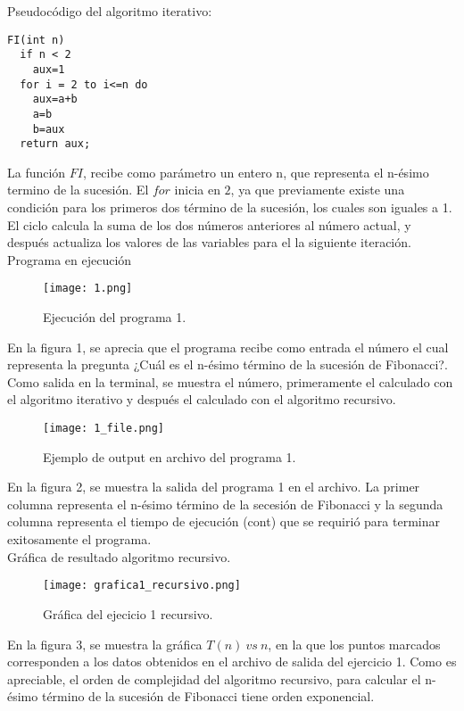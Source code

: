 \documentclass[12pt]{report}
\begin{document}
	Pseudocódigo del algoritmo iterativo:
	\lstset{language=C, breaklines=true, basicstyle=\footnotesize}
	\lstset{numbers=left, numberstyle=\tiny, stepnumber=1, numbersep=10pt}
	\begin{lstlisting}
FI(int n)
  if n < 2 
    aux=1
  for i = 2 to i<=n do
    aux=a+b	
    a=b		
    b=aux
  return aux;
	\end{lstlisting}
	
	La función $FI$, recibe como parámetro un entero n, que representa el n-ésimo termino de la sucesión. El $for$ inicia en $2$, ya que previamente existe una condición para los primeros dos término de la sucesión, los cuales son iguales a 1. El ciclo calcula la suma de los dos números anteriores al número actual, y después actualiza los valores de las variables para el la siguiente iteración.\\
	
	Programa en ejecución\\
	\begin{figure}[H]
		\texttt{[image: 1.png]}
		\centering
		\caption{Ejecución del programa 1.}
		\centering
	\end{figure}
	En la figura 1, se aprecia que el programa recibe como entrada el número el cual representa la pregunta ¿Cuál es el n-ésimo término de la sucesión de Fibonacci?. Como salida en la terminal, se muestra el número, primeramente el calculado con el algoritmo iterativo y después el calculado con el algoritmo recursivo.

	\begin{figure}[H]
		\texttt{[image: 1\_file.png]}
		\centering
		\caption{Ejemplo de output en archivo del programa 1.}
		\centering
	\end{figure}
	En la figura 2, se muestra la salida del programa 1 en el archivo. La primer columna representa el n-ésimo término de la secesión de Fibonacci y la segunda columna representa el tiempo de ejecución (cont) que se requirió para terminar exitosamente el programa.\\
		
	Gráfica de resultado algoritmo recursivo.\\
		\begin{figure}[H]
			\texttt{[image: grafica1\_recursivo.png]}
			\centering
			\caption{Gráfica del ejecicio 1 recursivo.}
			\centering
		\end{figure}
	En la figura 3, se muestra la gráfica $T(n) \ vs \ n$, en la que los puntos marcados corresponden a los datos obtenidos en el archivo de salida del ejercicio 1. Como es apreciable, el orden de complejidad del algoritmo recursivo, para calcular el n-ésimo término de la sucesión de Fibonacci tiene orden exponencial.\newpage
	
\end{document}
